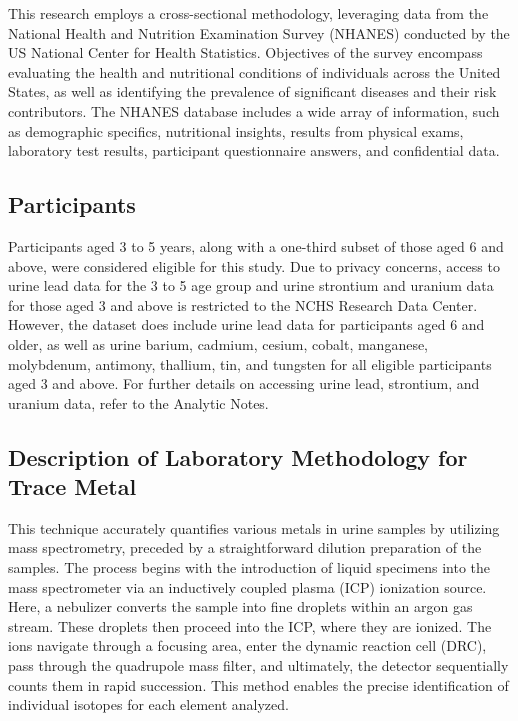 \documentclass[
  man,floatsintext]{apa6}
\begin{document}
This research employs a cross-sectional methodology, leveraging data from the National Health and Nutrition Examination Survey (NHANES) conducted by the US National Center for Health Statistics. Objectives of the survey encompass evaluating the health and nutritional conditions of individuals across the United States, as well as identifying the prevalence of significant diseases and their risk contributors. The NHANES database includes a wide array of information, such as demographic specifics, nutritional insights, results from physical exams, laboratory test results, participant questionnaire answers, and confidential data.

\hypertarget{participants}{%
\subsection{Participants}\label{participants}}

Participants aged 3 to 5 years, along with a one-third subset of those aged 6 and above, were considered eligible for this study. Due to privacy concerns, access to urine lead data for the 3 to 5 age group and urine strontium and uranium data for those aged 3 and above is restricted to the NCHS Research Data Center. However, the dataset does include urine lead data for participants aged 6 and older, as well as urine barium, cadmium, cesium, cobalt, manganese, molybdenum, antimony, thallium, tin, and tungsten for all eligible participants aged 3 and above. For further details on accessing urine lead, strontium, and uranium data, refer to the Analytic Notes.

\hypertarget{description-of-laboratory-methodology-for-trace-metal}{%
\subsection{Description of Laboratory Methodology for Trace Metal}\label{description-of-laboratory-methodology-for-trace-metal}}

This technique accurately quantifies various metals in urine samples by utilizing mass spectrometry, preceded by a straightforward dilution preparation of the samples. The process begins with the introduction of liquid specimens into the mass spectrometer via an inductively coupled plasma (ICP) ionization source. Here, a nebulizer converts the sample into fine droplets within an argon gas stream. These droplets then proceed into the ICP, where they are ionized. The ions navigate through a focusing area, enter the dynamic reaction cell (DRC), pass through the quadrupole mass filter, and ultimately, the detector sequentially counts them in rapid succession. This method enables the precise identification of individual isotopes for each element analyzed.
\end{document}
